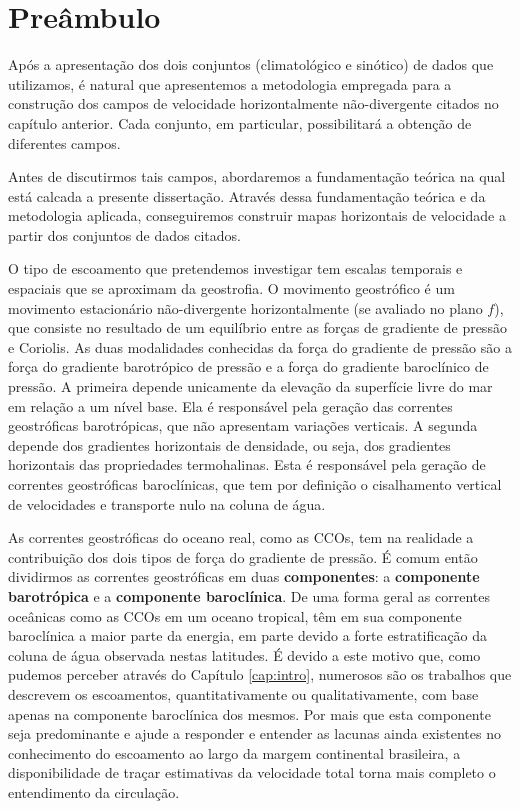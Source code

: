 \section{Preâmbulo}\label{sec:pre_funccorr}

\hspace{6mm} Após a apresentação dos dois conjuntos (climatológico e sinótico) 
de dados que utilizamos, é natural que apresentemos a metodologia empregada para a 
construção dos campos de velocidade horizontalmente não-divergente 
citados no capítulo anterior. Cada conjunto, 
em particular, possibilitará a obtenção de diferentes campos. 

Antes de discutirmos tais campos, abordaremos a fundamentação teórica na qual está
calcada a presente dissertação. Através dessa fundamentação teórica e da metodologia 
aplicada, conseguiremos construir mapas horizontais de velocidade a partir dos 
conjuntos de dados citados. 

O tipo de escoamento que pretendemos investigar tem escalas temporais e espaciais
que se aproximam da geostrofia. O movimento geostrófico é um movimento 
estacionário não-divergente horizontalmente (se avaliado no plano $f$), que consiste no resultado de 
um equilíbrio entre as forças de gradiente
de pressão e Coriolis. As duas modalidades conhecidas da força do gradiente de 
pressão são a força do gradiente barotrópico de pressão e a força do gradiente baroclínico de
pressão. A primeira depende unicamente da elevação da superfície livre
do mar em relação a um nível base. Ela é responsável pela geração das correntes
geostróficas barotrópicas, que não apresentam variações verticais.
A segunda depende dos gradientes horizontais de densidade, 
ou seja, dos gradientes horizontais das propriedades termohalinas. Esta é responsável
pela geração de correntes geostróficas baroclínicas, que tem por definição o cisalhamento
vertical de velocidades e transporte nulo na coluna de água. 

As correntes geostróficas do oceano real, como as CCOs, tem na realidade a con\-tri\-bu\-i\-ção
dos dois tipos de força do gradiente de pressão. É comum então dividirmos as correntes
geostróficas em duas {\bf componentes}: a {\bf componente barotrópica} e a {\bf componente baroclínica}.
De uma forma geral as correntes oceânicas como as CCOs em um oceano tropical, têm em sua 
componente baroclínica a maior parte da energia, em parte devido a forte estratificação
da coluna de água observada nestas latitudes. É devido a este motivo que, como pudemos
perceber através do Capítulo \ref{cap:intro}, numerosos são os trabalhos que descrevem os escoamentos, 
quantitativamente ou qualitativamente, com base apenas na componente baroclínica dos mesmos. 
Por mais que esta componente seja predominante e ajude a responder e entender as lacunas
ainda existentes no conhecimento do escoamento ao largo da margem continental brasileira, 
a disponibilidade de traçar estimativas da velocidade total torna mais completo o entendimento
da circulação. 

